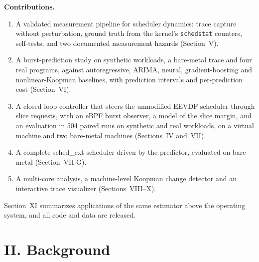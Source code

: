 \documentclass{article}
\begin{document}
\textbf{Contributions.}
\begin{enumerate}
\item A validated measurement pipeline for scheduler dynamics: trace capture without perturbation, ground truth from the kernel's \texttt{schedstat} counters, self-tests, and two documented measurement hazards (Section~V).
\item A burst-prediction study on synthetic workloads, a bare-metal trace and four real programs, against autoregressive, ARIMA, neural, gradient-boosting and nonlinear-Koopman baselines, with prediction intervals and per-prediction cost (Section~VI).
\item A closed-loop controller that steers the unmodified EEVDF scheduler through slice requests, with an eBPF burst observer, a model of the slice margin, and an evaluation in 504 paired runs on synthetic and real workloads, on a virtual machine and two bare-metal machines (Sections~IV and~VII).
\item A complete sched\_ext scheduler driven by the predictor, evaluated on bare metal (Section~VII-G).
\item A multi-core analysis, a machine-level Koopman change detector and an interactive trace visualizer (Sections~VIII--X).
\end{enumerate}
Section~XI summarizes applications of the same estimator above the operating system, and all code and data are released.

\section*{II. Background}
\end{document}
